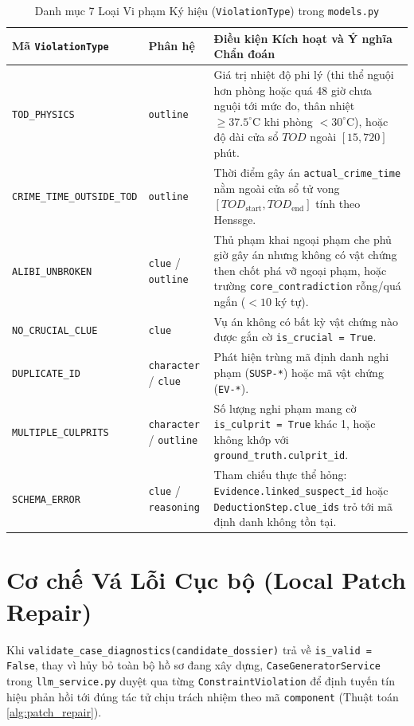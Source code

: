 \begin{table}[H]
\centering
\caption{Danh mục 7 Loại Vi phạm Ký hiệu (\texttt{ViolationType}) trong \texttt{models.py}}
\label{tab:violation_taxonomy}
\begin{tabularx}{\textwidth}{l p{2.2cm} X}
\toprule
\textbf{Mã \texttt{ViolationType}} & \textbf{Phân hệ} & \textbf{Điều kiện Kích hoạt và Ý nghĩa Chẩn đoán} \\
\midrule
\texttt{TOD\_PHYSICS} & \texttt{outline} & Giá trị nhiệt độ phi lý (thi thể nguội hơn phòng hoặc quá 48 giờ chưa nguội tới mức đo, thân nhiệt $\ge 37.5^\circ\text{C}$ khi phòng $< 30^\circ\text{C}$), hoặc độ dài cửa sổ $TOD$ ngoài $[15, 720]$ phút. \\
\texttt{CRIME\_TIME\_OUTSIDE\_TOD} & \texttt{outline} & Thời điểm gây án \texttt{actual\_crime\_time} nằm ngoài cửa sổ tử vong $[TOD_{\text{start}}, TOD_{\text{end}}]$ tính theo Henssge. \\
\texttt{ALIBI\_UNBROKEN} & \texttt{clue} / \texttt{outline} & Thủ phạm khai ngoại phạm che phủ giờ gây án nhưng không có vật chứng then chốt phá vỡ ngoại phạm, hoặc trường \texttt{core\_contradiction} rỗng/quá ngắn ($< 10$ ký tự). \\
\texttt{NO\_CRUCIAL\_CLUE} & \texttt{clue} & Vụ án không có bất kỳ vật chứng nào được gắn cờ \texttt{is\_crucial = True}. \\
\texttt{DUPLICATE\_ID} & \texttt{character} / \texttt{clue} & Phát hiện trùng mã định danh nghi phạm (\texttt{SUSP-*}) hoặc mã vật chứng (\texttt{EV-*}). \\
\texttt{MULTIPLE\_CULPRITS} & \texttt{character} / \texttt{outline} & Số lượng nghi phạm mang cờ \texttt{is\_culprit = True} khác 1, hoặc không khớp với \texttt{ground\_truth.culprit\_id}. \\
\texttt{SCHEMA\_ERROR} & \texttt{clue} / \texttt{reasoning} & Tham chiếu thực thể hỏng: \texttt{Evidence.linked\_suspect\_id} hoặc \texttt{DeductionStep.clue\_ids} trỏ tới mã định danh không tồn tại. \\
\bottomrule
\end{tabularx}
\end{table}

\section{Cơ chế Vá Lỗi Cục bộ (Local Patch Repair)}
\label{sec:arch_patch_repair}

Khi \texttt{validate\_case\_diagnostics(candidate\_dossier)} trả về \texttt{is\_valid = False}, thay vì hủy bỏ toàn bộ hồ sơ đang xây dựng, \texttt{CaseGeneratorService} trong \texttt{llm\_service.py} duyệt qua từng \texttt{ConstraintViolation} để định tuyến tín hiệu phản hồi tới đúng tác tử chịu trách nhiệm theo mã \texttt{component} (Thuật toán \ref{alg:patch_repair}).

